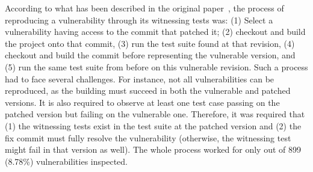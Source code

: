 According to what has been described in the \VulforJ original paper~\cite{bui:msr2022:vul4j}, the process of reproducing a vulnerability through its witnessing tests was: (1) Select a vulnerability having access to the commit that patched it; (2) checkout and build the project onto that commit, (3) run the test suite found at that revision, (4) checkout and build the commit before representing the vulnerable version, and (5) run the same test suite from before on this vulnerable revision.
%
Such a process had to face several challenges.
For instance, not all vulnerabilities can be reproduced, as the building must succeed in both the vulnerable and patched versions.
It is also required to observe at least one test case passing on the patched version but failing on the vulnerable one.
Therefore, it was required that (1) the witnessing tests exist in the test suite at the patched version and (2) the fix commit must fully resolve the vulnerability (otherwise, the witnessing test might fail in that version as well).
The whole process worked for only \vulforjVulns out of 899 (8.78\%) vulnerabilities inspected.

